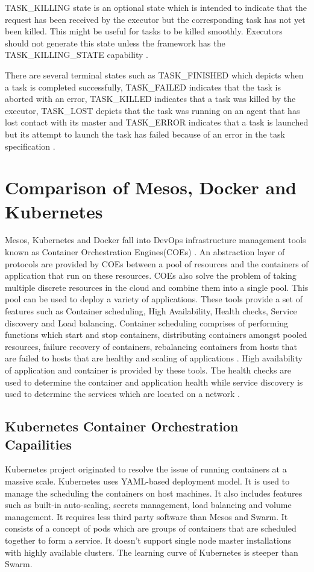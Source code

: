 \documentclass[9pt,twocolumn,twoside]{../../styles/osajnl}
\begin{document}
TASK\_KILLING state is an optional state which is intended to indicate
that the request has been received by the executor but the
corresponding task has not yet been killed. This might be useful for
tasks to be killed smoothly.  Executors should not generate this state
unless the framework has the TASK\_KILLING\_STATE capability
\cite{www-mesos-frmwrk}.

There are several terminal states such as TASK\_FINISHED which depicts
when a task is completed successfully, TASK\_FAILED indicates that the
task is aborted with an error, TASK\_KILLED indicates that a task was
killed by the executor, TASK\_LOST depicts that the task was running
on an agent that has lost contact with its master and TASK\_ERROR
indicates that a task is launched but its attempt to launch the task
has failed because of an error in the task specification
\cite{www-mesos-frmwrk}.

\section{Comparison of Mesos, Docker and Kubernetes}
Mesos, Kubernetes and Docker fall into DevOps infrastructure
management tools known as Container Orchestration Engines(COEs)
\cite{mesos-cmp}. An abstraction layer of protocols are provided by
COEs between a pool of resources and the containers of application
that run on these resources. COEs also solve the problem of taking
multiple discrete resources in the cloud and combine them into a
single pool. This pool can be used to deploy a variety of
applications. These tools provide a set of features such as Container
scheduling, High Availability, Health checks, Service discovery and
Load balancing. Container scheduling comprises of performing functions
which start and stop containers, distributing containers amongst
pooled resources, failure recovery of containers, rebalancing
containers from hosts that are failed to hosts that are healthy and
scaling of applications \cite{mesos-cmp}. High availability of
application and container is provided by these tools. The health
checks are used to determine the container and application health
while service discovery is used to determine the services which are
located on a network \cite{mesos-cmp}.

\subsection{Kubernetes Container Orchestration Capailities}
Kubernetes project originated to resolve the issue of running
containers at a massive scale. Kubernetes uses YAML-based deployment
model. It is used to manage the scheduling the containers on host
machines. It also includes features such as built-in auto-scaling,
secrets management, load balancing and volume management. It requires
less third party software than Mesos and Swarm. It consists of a
concept of pods which are groups of containers that are scheduled
together to form a service. It doesn't support single node master
installations with highly available clusters. The learning curve of
Kubernetes is steeper than Swarm.
\end{document}
